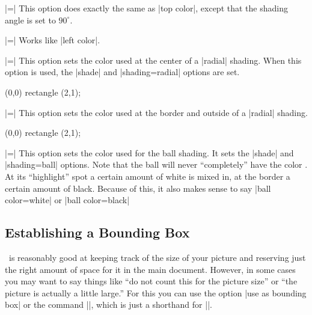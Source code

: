 \begin{itemize}
  |=|
  This option does exactly the same as |top color|, except that the
  shading angle is set to $90^\circ$.

  |=|
  Works like |left color|.

  |=|
  This option sets the color used at the center of a |radial|
  shading. When this option is used, the |shade| and |shading=radial|
  options are set.
  
\begin{codeexample}[]
\tikz \draw[inner color=red] (0,0) rectangle (2,1);
\end{codeexample}

  |=|
  This option sets the color used at the border and outside of a
  |radial| shading.
  
\begin{codeexample}[]
\tikz \draw[outer color=red,inner color=white]
  (0,0) rectangle (2,1);
\end{codeexample}

  |=|
  This option sets the color used for the ball shading. It sets the
  |shade| and |shading=ball| options. Note that the ball will never
  ``completely'' have the color . At its ``highlight'' spot
  a certain amount of white is mixed in, at the border a certain
  amount of black. Because of this, it also makes sense to say
  |ball color=white| or |ball color=black|

\begin{codeexample}[]
\end{codeexample}
\end{itemize}




\subsection{Establishing a Bounding Box}

\pgfname\ is reasonably good at keeping track of the size of your picture
and reserving just the right amount of space for it in the main
document. However, in some cases you may want to say things like
``do not count this for the picture size'' or ``the picture is
actually a little large.'' For this you can use the option
|use as bounding box| or the command |\useasboundingbox|, which is just
a shorthand for ||.


